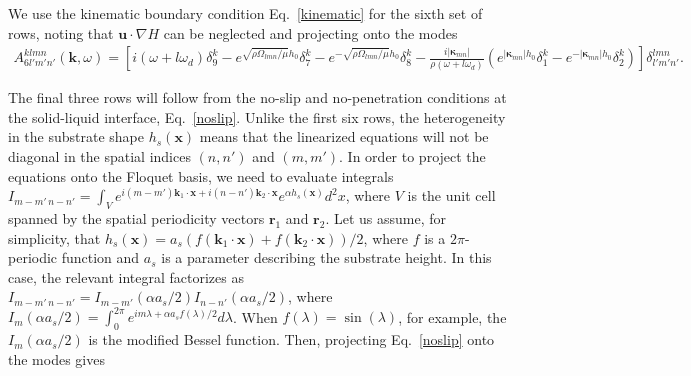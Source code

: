 \documentclass[aps,pre,amsmath,amssymb,floatfix,onecolumn,notitlepage,10pt]{revtex4-1}
\begin{document}
We use the kinematic boundary condition Eq.~\eqref{kinematic} for the sixth set of rows, noting that $\mathbf{u}\cdot\nabla H$ can be neglected and projecting onto the modes
\begin{align}
A^{klmn}_{6l'm'n'}(\mathbf{k}, \omega) = \left[i(\omega+l\omega_d)\delta^k_9 - e^{\sqrt{\rho\Omega_{lmn}/\mu}h_0}\delta^k_7 - e^{-\sqrt{\rho\Omega_{lmn}/\mu}h_0} \delta^k_8 - \frac{i|\bm{\kappa}_{mn}|}{\rho(\omega+l\omega_d)}(e^{|\bm{\kappa}_{mn}|h_0}\delta^k_1 - e^{-|\bm{\kappa}_{mn}|h_0}\delta^k_2)\right]\delta^{lmn}_{l'm'n'}. \label{lkinematic}
\end{align}

The final three rows will follow from the no-slip and no-penetration conditions at the solid-liquid interface, Eq.~\eqref{noslip}. Unlike the first six rows, the heterogeneity in the substrate shape $h_s(\mathbf{x})$ means that the linearized equations will not be diagonal in the spatial indices $(n,n')$ and $(m,m')$. In order to project the equations onto the Floquet basis, we need to evaluate integrals $I_{m-m'\, n-n'} =\int_V e^{i(m-m')\mathbf{k}_1\cdot\mathbf{x}+i(n-n')\mathbf{k}_2\cdot\mathbf{x}}e^{\alpha h_s(\mathbf{x})} d^2x$, where $V$ is the unit cell spanned by the spatial periodicity vectors $\mathbf{r}_1$ and $\mathbf{r}_2$. Let us assume, for simplicity, that $h_s(\mathbf{x}) = a_s(f(\mathbf{k}_1\cdot \mathbf{x})+f(\mathbf{k}_2\cdot \mathbf{x}))/2$, where $f$ is a $2\pi$-periodic function and $a_s$ is a parameter describing the substrate height. In this case, the relevant integral factorizes as $I_{m-m'\, n-n'}  = I_{m-m'}(\alpha a_s/2)I_{n-n'}(\alpha a_s/2)$, where $I_{m}(\alpha a_s/2)=\int_0^{2\pi} e^{im\lambda+\alpha a_s f(\lambda)/2} d\lambda$. When $f(\lambda)=\sin(\lambda)$, for example, the $I_{m}(\alpha a_s/2)$ is the modified Bessel function. Then, projecting Eq.~\eqref{noslip} onto the modes gives
\end{document}
